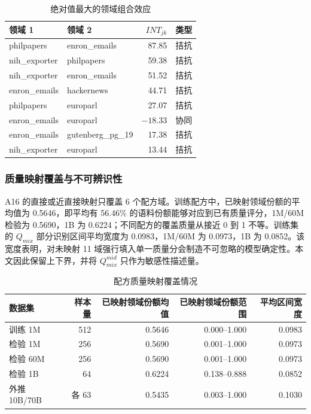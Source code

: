 \documentclass[bwprint]{gmcmthesis}
\begin{document}
        \begin{table}[H]
        \centering
        \caption{绝对值最大的领域组合效应}  %
        \label{tab:interactions}
        \begin{tabular}{llrr}
        \toprule
        领域 1 & 领域 2 & $INT_{jk}$ & 类型 \\
        \midrule
        philpapers & enron\_emails & 87.85 & 拮抗 \\
        nih\_exporter & philpapers & 59.38 & 拮抗 \\
        nih\_exporter & enron\_emails & 51.52 & 拮抗 \\
        enron\_emails & hackernews & 44.71 & 拮抗 \\
        philpapers & europarl & 27.07 & 拮抗 \\
        enron\_emails & europarl & $-18.33$ & 协同 \\
        enron\_emails & gutenberg\_pg\_19 & 17.38 & 拮抗 \\
        nih\_exporter & europarl & 13.44 & 拮抗 \\
        \bottomrule
        \end{tabular}
        \end{table}


        \subsubsection{质量映射覆盖与不可辨识性}    %
        A16 的直接或近直接映射只覆盖 6 个配方域。训练配方中，已映射领域份额的平均值为 0.5646，即平均有 56.46\% 的语料份额能够对应到已有质量评分，1M/60M 检验为 0.5690，1B 为 0.6224；不同配方的覆盖质量从接近 0 到 1 不等。训练集的 $Q_{mix}$ 部分识别区间平均宽度为 0.0983，1M/60M 为 0.0973，1B 为 0.0852。该宽度表明，对未映射 11 域强行填入单一质量分会制造不可忽略的模型确定性。本文因此保留上下界，并将 $Q_{mix}^{mid}$ 只作为敏感性描述量。
        
        \begin{table}[H]
        \centering
        \caption{配方质量映射覆盖情况}    %
        \label{tab:mapping}
        \begin{tabular}{lrrrr}
        \toprule
        数据集 & 样本量 & 已映射领域份额均值 & 已映射领域份额范围 & 平均区间宽度 \\
        \midrule
        训练 1M & 512 & 0.5646 & 0.000--1.000 & 0.0983 \\
        检验 1M & 256 & 0.5690 & 0.001--1.000 & 0.0973 \\
        检验 60M & 256 & 0.5690 & 0.001--1.000 & 0.0973 \\
        检验 1B & 64 & 0.6224 & 0.138--0.888 & 0.0852 \\
        外推 10B/70B & 各 63 & 0.5435 & 0.003--1.000 & 0.1030 \\
        \bottomrule
        \end{tabular}
        \end{table}
\end{document}
